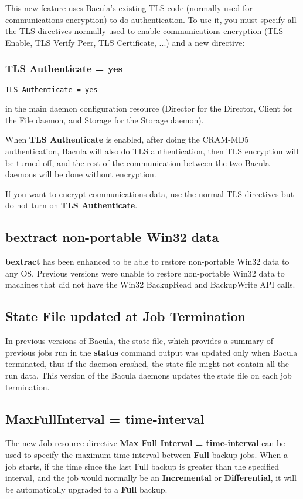 This new feature uses Bacula's existing TLS code (normally used for
communications encryption) to do authentication.  To use it, you must
specify all the TLS directives normally used to enable communications
encryption (TLS Enable, TLS Verify Peer, TLS Certificate, ...) and
a new directive:

\subsubsection{TLS Authenticate = yes}
\begin{verbatim}
TLS Authenticate = yes
\end{verbatim}

in the main daemon configuration resource (Director for the Director,
Client for the File daemon, and Storage for the Storage daemon).

When {\bf TLS Authenticate} is enabled, after doing the CRAM-MD5
authentication, Bacula will also do TLS authentication, then TLS 
encryption will be turned off, and the rest of the communication between
the two Bacula daemons will be done without encryption.

If you want to encrypt communications data, use the normal TLS directives
but do not turn on {\bf TLS Authenticate}.

\subsection{bextract non-portable Win32 data}
{\bf bextract} has been enhanced to be able to restore
non-portable Win32 data to any OS.  Previous versions were 
unable to restore non-portable Win32 data to machines that
did not have the Win32 BackupRead and BackupWrite API calls.

\subsection{State File updated at Job Termination}
In previous versions of Bacula, the state file, which provides a
summary of previous jobs run in the {\bf status} command output was
updated only when Bacula terminated, thus if the daemon crashed, the
state file might not contain all the run data.  This version of
the Bacula daemons updates the state file on each job termination.

\subsection{MaxFullInterval = \lt{}time-interval\gt{}}
The new Job resource directive {\bf Max Full Interval = \lt{}time-interval\gt{}}
can be used to specify the maximum time interval between {\bf Full} backup
jobs. When a job starts, if the time since the last Full backup is
greater than the specified interval, and the job would normally be an
{\bf Incremental} or {\bf Differential}, it will be automatically
upgraded to a {\bf Full} backup.

